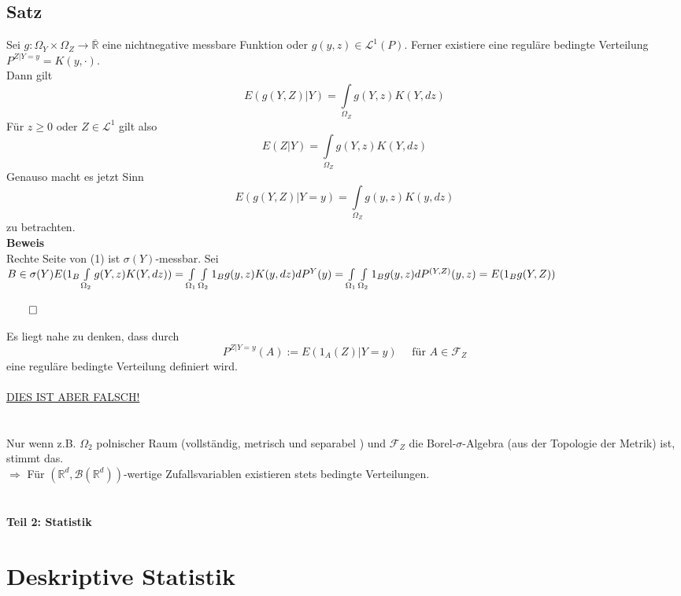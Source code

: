 \documentclass[german,10pt,oneside, fleqn, a4paper]{article}
\newcommand {\R}	{\mathbb{R}}
\newcommand{\Ra}	{\Rightarrow}
\newcommand{\ra}{\rightarrow}
\newcommand{\brc}[1]{\left(#1\right)}
\newcommand{\QED}{\begin{flushright}$\qed$\end{flushright}}
\newcommand{\mc}[1]{\mathcal{#1}}
\newcommand{\lp}[1]{\mc{L}^{#1}}
\newcommand{\beweis}{\textbf{Beweis}\\}
\newcommand{\1}[1]{1_{#1}}
\newcommand{\2}[1]{\1{\brac{#1}}}
\newcommand{\rbor}[1][d]{\brc{\R^{#1},\mc{B}\brc{\R^{#1}}}}
\newcommand{\f}{\mc{F}}
\begin{document}
\subsection{Satz}
\label{7.6}
Sei $g:\Omega_Y\times\Omega_Z\ra\overline{\R}$ eine nichtnegative messbare Funktion oder $g(y,z)\in\lp{1}(P).$ Ferner existiere eine reguläre bedingte Verteilung $P^{Z|Y=y}=K(y,\cdot).$\\
Dann gilt\begin{equation}
E(g(Y,Z)|Y)=\int\limits_{\Omega_Z}g(Y,z)K(Y,dz)
\end{equation}
Für $z\geq0$ oder $Z\in\lp{1}$ gilt also \[
E(Z|Y)=\int\limits_{\Omega_Z}g(Y,z)K(Y,dz)\]
Genauso macht es jetzt Sinn \[
E(g(Y,Z)|Y=y)=\int\limits_{\Omega_Z}g(y,z)K(y,dz)\]
zu betrachten.\\
\beweis
Rechte Seite von (1) ist $\sigma(Y)$-messbar. Sei $B\in\sigma(Y)\\
E(1_B\int\limits_{\Omega_2}g(Y,z)K(Y,dz))=\int\limits_{\Omega_1}\int\limits_{\Omega_2}1_Bg(y,z)K(y,dz)dP^Y(y)\\
=\int\limits_{\Omega_1}\int\limits_{\Omega_2}1_Bg(y,z)dP^{(Y,Z)}(y,z)=E(1_Bg(Y,Z))$\QED

Es liegt nahe zu denken, dass durch \[
P^{Z|Y=y}(A):=E(1_A(Z)|Y=y)\quad\text{ für } A\in\f_Z\]
eine reguläre bedingte Verteilung definiert wird.\\
\\

\underline{\large{DIES IST ABER FALSCH!}}\\
\\
\\
Nur wenn z.B. $\Omega_2$ polnischer Raum (vollständig, metrisch und separabel%
) und $\f_Z$ die Borel-$\sigma$-Algebra (aus der Topologie der Metrik) ist, stimmt das.\\
$\Ra$ Für $\rbor$-wertige Zufallsvariablen existieren stets bedingte Verteilungen.
\\
\\
\\






\textbf{\huge{Teil 2: Statistik}}
\section{Deskriptive Statistik}
\end{document}
